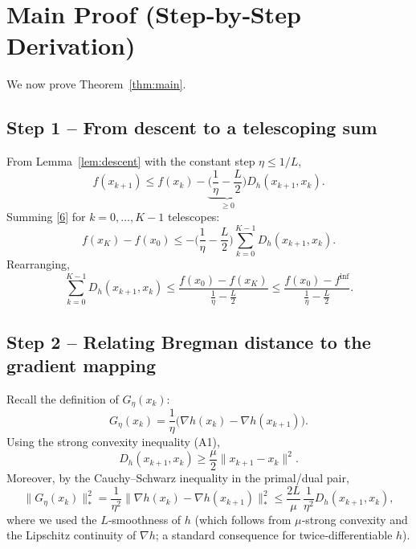 \documentclass{article}
\newcommand{\grad}{\nabla}
\newcommand{\D}[2]{D_h(#1,#2)}
\begin{document}
\section*{Main Proof (Step‑by‑Step Derivation)}
We now prove Theorem~\ref{thm:main}.

\subsection*{Step 1 – From descent to a telescoping sum}
From Lemma~\ref{lem:descent} with the constant step $\eta\le 1/L$,
\[
f(x_{k+1})\le f(x_k)-\underbrace{\Big(\frac{1}{\eta}-\frac{L}{2}\Big)}_{\ge 0}\D{x_{k+1}}{x_k}.
\tag{6}
\]
Summing \eqref{6} for $k=0,\dots,K-1$ telescopes:
\[
f(x_K)-f(x_0)\le -\Big(\frac{1}{\eta}-\frac{L}{2}\Big)\sum_{k=0}^{K-1}\D{x_{k+1}}{x_k}.
\tag{7}
\]
Rearranging,
\[
\sum_{k=0}^{K-1}\D{x_{k+1}}{x_k}
\le \frac{f(x_0)-f(x_K)}{\frac{1}{\eta}-\frac{L}{2}}
\le \frac{f(x_0)-f^{\inf}}{\frac{1}{\eta}-\frac{L}{2}}.
\tag{8}
\]

\subsection*{Step 2 – Relating Bregman distance to the gradient mapping}
Recall the definition of $G_{\eta}(x_k)$:
\[
G_{\eta}(x_k)=\frac{1}{\eta}\bigl(\grad h(x_k)-\grad h(x_{k+1})\bigr).
\tag{9}
\]
Using the strong convexity inequality (A1),
\[
\D{x_{k+1}}{x_k}\ge\frac{\mu}{2}\|x_{k+1}-x_k\|^{2}.
\tag{10}
\]
Moreover, by the Cauchy–Schwarz inequality in the primal/dual pair,
\[
\|G_{\eta}(x_k)\|_{*}^{2}
= \frac{1}{\eta^{2}}\|\grad h(x_k)-\grad h(x_{k+1})\|_{*}^{2}
\le \frac{2L}{\mu}\,\frac{1}{\eta^{2}}\D{x_{k+1}}{x_k},
\tag{11}
\]
where we used the $L$‑smoothness of $h$ (which follows from $\mu$‑strong convexity and the Lipschitz continuity of $\grad h$; a standard consequence for twice‑differentiable $h$).
\end{document}

